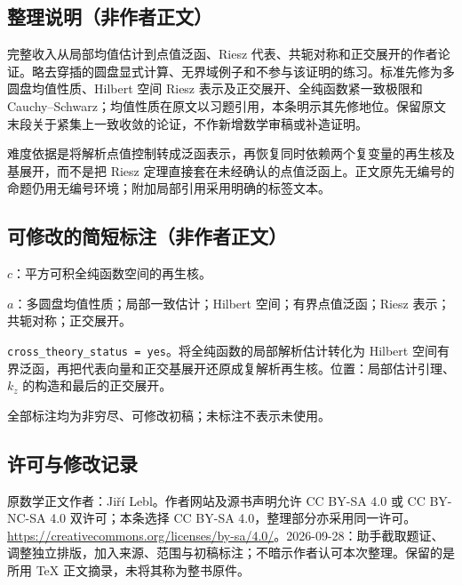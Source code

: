 \documentclass[UTF8,11pt]{ctexart}
\theoremstyle{definition}
\begin{document}
\subsection*{整理说明（非作者正文）}
完整收入从局部均值估计到点值泛函、Riesz 代表、共轭对称和正交展开的作者论证。略去穿插的圆盘显式计算、无界域例子和不参与该证明的练习。标准先修为多圆盘均值性质、Hilbert 空间 Riesz 表示及正交展开、全纯函数紧一致极限和 Cauchy--Schwarz；均值性质在原文以习题引用，本条明示其先修地位。保留原文末段关于紧集上一致收敛的论证，不作新增数学审稿或补造证明。

难度依据是将解析点值控制转成泛函表示，再恢复同时依赖两个复变量的再生核及基展开，而不是把 Riesz 定理直接套在未经确认的点值泛函上。正文原先无编号的命题仍用无编号环境；附加局部引用采用明确的标签文本。
\subsection*{可修改的简短标注（非作者正文）}
$c$：平方可积全纯函数空间的再生核。

$a$：多圆盘均值性质；局部一致估计；Hilbert 空间；有界点值泛函；Riesz 表示；共轭对称；正交展开。

\texttt{cross\_theory\_status = yes}。将全纯函数的局部解析估计转化为 Hilbert 空间有界泛函，再把代表向量和正交基展开还原成复解析再生核。位置：局部估计引理、$k_z$ 的构造和最后的正交展开。

全部标注均为非穷尽、可修改初稿；未标注不表示未使用。
\subsection*{许可与修改记录}
原数学正文作者：Ji\v{r}\'i Lebl。作者网站及源书声明允许 CC BY-SA 4.0 或 CC BY-NC-SA 4.0 双许可；本条选择 CC BY-SA 4.0，整理部分亦采用同一许可。\url{https://creativecommons.org/licenses/by-sa/4.0/}。2026-09-28：助手截取题证、调整独立排版，加入来源、范围与初稿标注；不暗示作者认可本次整理。保留的是所用 TeX 正文摘录，未将其称为整书原件。
\end{document}
